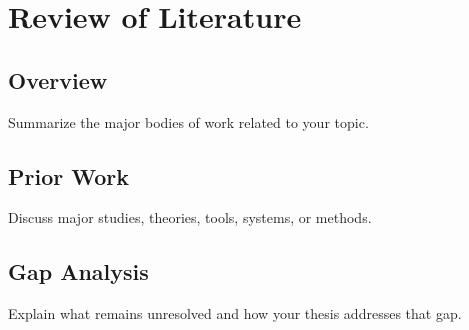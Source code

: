 \chapter{Review of Literature}
\label{ch:literature-review}

\section{Overview}
\label{sec:lit-overview}

Summarize the major bodies of work related to your topic.

\section{Prior Work}
\label{sec:prior-work}

Discuss major studies, theories, tools, systems, or methods.

\section{Gap Analysis}
\label{sec:gap-analysis}

Explain what remains unresolved and how your thesis addresses that gap.
